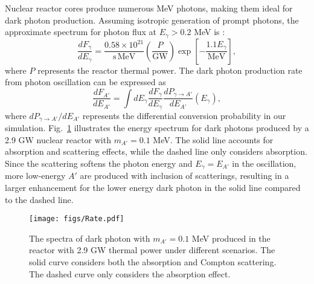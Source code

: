 \documentclass[prd,showpacs,preprintnumbers,amsmath,amssymb,twocolumn,superscriptaddress,notitlepage]{revtex4-2}
\begin{document}
Nuclear reactor cores produce numerous MeV photons, making them ideal for dark photon production. Assuming isotropic generation of prompt photons, the approximate spectrum for photon flux at $E_\gamma > 0.2$ MeV is
\cite{Bechteler:1984}:
\begin{equation}
\frac{dF_\gamma}{dE_\gamma} = \frac{0.58 \times 10^{21}}{\mathrm{s}\, \mathrm{MeV}}\left(\frac{P}{\mathrm{GW}}\right) \exp\left[-\frac{1.1E_\gamma}{\mathrm{MeV}}\right],
\label{eq: gamma flux}
\end{equation}
where $P$ represents the reactor thermal power.
% 
The dark photon production rate from photon oscillation can be expressed as
\begin{equation}
\frac{dF_{A'}}{dE_{A'}} = \int dE_\gamma \frac{dF_\gamma}{dE_\gamma} \frac{dP_{\gamma \to A'}}{dE_{A'}}(E_\gamma),
\label{eq: A' spectra}
\end{equation}
where ${dP_{\gamma \to A'}}/{dE_{A'}}$ represents the differential conversion probability in our simulation. 
% 
Fig.~\ref{fig: DP production rate} illustrates the energy spectrum for dark photons produced by a 2.9 GW nuclear reactor with $m_{A'} = 0.1$ MeV. 
The solid line accounts for absorption and scattering effects,
while the dashed line only considers absorption.
Since the scattering softens the photon energy and $E_\gamma = E_{A'}$ in the oscillation,
more low-energy $A'$ are produced with inclusion of scatterings, 
resulting in a larger enhancement for the lower energy dark photon in the solid line compared to the dashed line. 
% 

\begin{figure}[htbp]
\begin{centering} 
\texttt{[image: figs/Rate.pdf]}
\caption{The spectra of dark photon with $m_{A'} = 0.1$ MeV produced in the reactor with 2.9 GW thermal power under different scenarios.
The solid curve considers both the absorption and
Compton scattering.
The dashed curve only considers
the absorption effect.
}
\label{fig: DP production rate}
\end{centering}
\end{figure}
\end{document}
